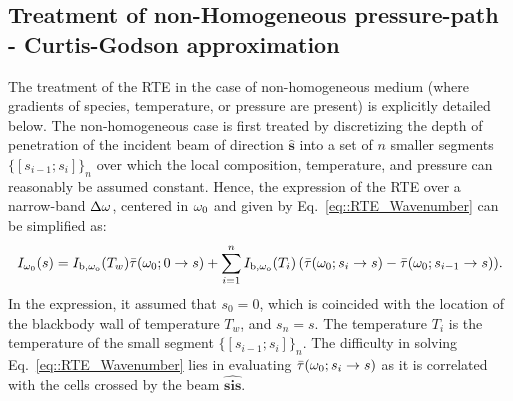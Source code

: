 \subsection{Treatment of non-Homogeneous pressure-path - Curtis-Godson approximation}
\label{sec::Curtis_Godson}
The treatment of the RTE in the case of non-homogeneous medium (where gradients of species, temperature, or pressure are present) is explicitly detailed below. The non-homogeneous case is first treated by discretizing the depth of penetration of the incident beam of direction $\hat{\textbf{s}}$ into a set of $n$ smaller segments $\{[s_{i-1};s_i]\}_n$ over which the local composition, temperature, and pressure can reasonably be assumed constant. Hence, the expression of the RTE over a narrow-band $\Delta \omega$, centered in $\omega_0$ and given by Eq.~\ref{eq::RTE_Wavenumber} can be simplified as:
\begin{equation}\label{eq::RTE_wavenumber_NH}
I_{\omega_0}(s) = I_{\rm b,\omega_o}(T_w) \bar{\tau}(\omega_0; 0 \rightarrow s) + \displaystyle\sum_{i=1}^n{I_{\rm b,\omega_o}(T_i)\left(\bar{\tau}(\omega_0; s_i \rightarrow s)-\bar{\tau}(\omega_0; s_{i-1} \rightarrow s)\right)}.
\end{equation}
In the expression, it assumed that $s_0 = 0$, which is coincided with the location of the blackbody wall of temperature $T_w$, and $s_n = s$. The temperature $T_i$ is the temperature of the small segment $\{[s_{i-1};s_i]\}_n$. The difficulty in solving Eq.~\ref{eq::RTE_Wavenumber} lies in evaluating  $\bar{\tau}(\omega_0; s_i \rightarrow s)$ as it is correlated with the cells crossed by the beam $\widehat{\textbf{sis}}$.

